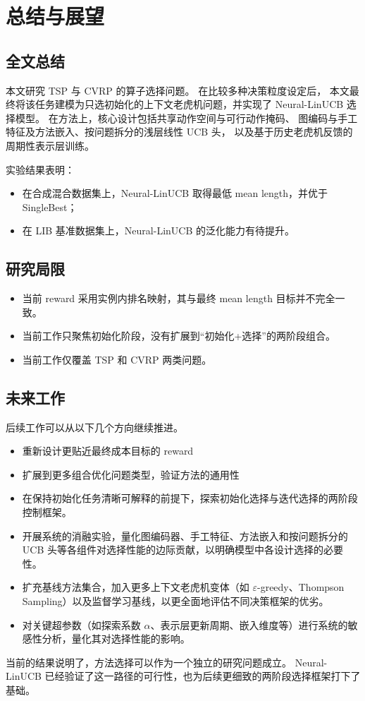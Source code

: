 
\section{总结与展望}
\label{sec:conclusion}

\subsection{全文总结}

本文研究 TSP 与 CVRP 的算子选择问题。
在比较多种决策粒度设定后，
本文最终将该任务建模为只选初始化的上下文老虎机问题，并实现了 Neural-LinUCB 选择模型。
在方法上，核心设计包括共享动作空间与可行动作掩码、
图编码与手工特征及方法嵌入、按问题拆分的浅层线性 UCB 头，
以及基于历史老虎机反馈的周期性表示层训练。

实验结果表明：
\begin{itemize}
  \item 在合成混合数据集上，Neural-LinUCB 取得最低 mean length，并优于 SingleBest；
  \item 在 LIB 基准数据集上，Neural-LinUCB 的泛化能力有待提升。
\end{itemize}

\subsection{研究局限}
\begin{itemize}
  \item 当前 reward 采用实例内排名映射，其与最终 mean length 目标并不完全一致。
  \item 当前工作只聚焦初始化阶段，没有扩展到“初始化+选择”的两阶段组合。
  \item 当前工作仅覆盖 TSP 和 CVRP 两类问题。
\end{itemize}

\subsection{未来工作}

后续工作可以从以下几个方向继续推进。
\begin{itemize}
  \item 重新设计更贴近最终成本目标的 reward
  \item 扩展到更多组合优化问题类型，验证方法的通用性
  \item 在保持初始化任务清晰可解释的前提下，探索初始化选择与迭代选择的两阶段控制框架。
  \item 开展系统的消融实验，量化图编码器、手工特征、方法嵌入和按问题拆分的UCB 头等各组件对选择性能的边际贡献，以明确模型中各设计选择的必要性。
  \item 扩充基线方法集合，加入更多上下文老虎机变体（如 $\varepsilon$-greedy、Thompson Sampling）以及监督学习基线，以更全面地评估不同决策框架的优劣。
  \item 对关键超参数（如探索系数 $\alpha$、表示层更新周期、嵌入维度等）进行系统的敏感性分析，量化其对选择性能的影响。
\end{itemize}

当前的结果说明了，方法选择可以作为一个独立的研究问题成立。
Neural-LinUCB 已经验证了这一路径的可行性，也为后续更细致的两阶段选择框架打下了基础。
